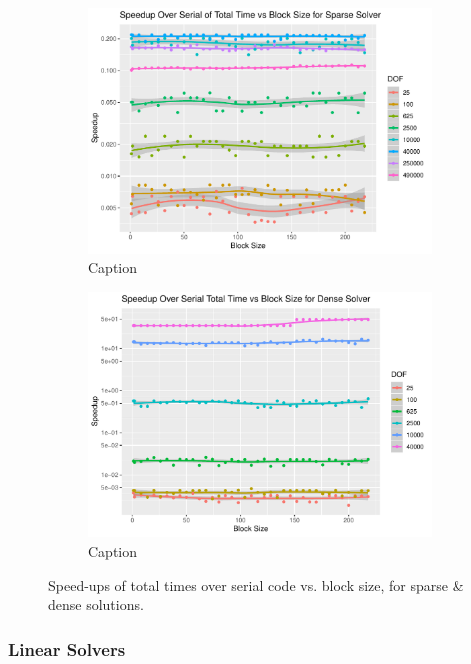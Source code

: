 \begin{figure}
	\centering
	\begin{subfigure}{0.48\linewidth}
		\centering
		\includegraphics[width = \linewidth]{Plots/total_sparse_cpu_speedup_vs_b}
		\caption{Caption}
		\label{fig:tot_sparse_b}
	\end{subfigure}\hfill
	\begin{subfigure}{0.48\linewidth}
		\centering
		\includegraphics[width=\linewidth]{Plots/total_dense_cpu_speedup_vs_b}
		\caption{Caption}
		\label{fig:tot_dense_b}
	\end{subfigure}
	\caption{Speed-ups of total times over serial code vs. block size, for sparse \& dense solutions.}
	\label{fig:tot_b}
\end{figure}

\subsubsection{Linear Solvers}

